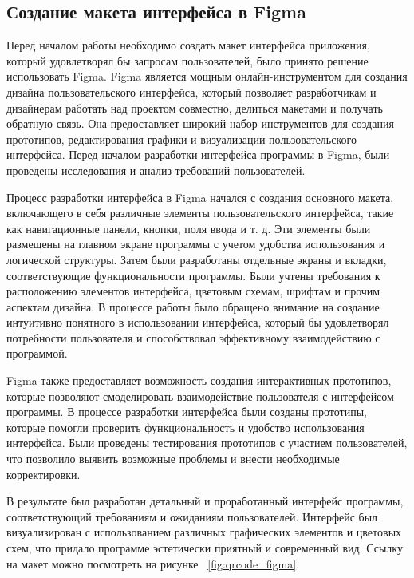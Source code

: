 \subsection{Создание макета интерфейса в Figma}

Перед началом работы необходимо создать макет интерфейса приложения, который удовлетворял бы запросам пользователей, было принято решение использовать Figma. Figma является мощным онлайн-инструментом для создания дизайна пользовательского интерфейса, который позволяет разработчикам и дизайнерам работать над проектом совместно, делиться макетами и получать обратную связь. Она предоставляет широкий набор инструментов для создания прототипов, редактирования графики и визуализации пользовательского интерфейса. Перед началом разработки интерфейса программы в Figma, были проведены исследования и анализ требований пользователей. 

Процесс разработки интерфейса в Figma начался с создания основного макета, включающего в себя различные элементы пользовательского интерфейса, такие как навигационные панели, кнопки, поля ввода и т. д. Эти элементы были размещены на главном экране программы с учетом удобства использования и логической структуры. Затем были разработаны отдельные экраны и вкладки, соответствующие функциональности программы. Были учтены требования к расположению элементов интерфейса, цветовым схемам, шрифтам и прочим аспектам дизайна. В процессе работы было обращено внимание на создание интуитивно понятного в использовании интерфейса, который бы удовлетворял потребности пользователя и способствовал эффективному взаимодействию с программой.

Figma также предоставляет возможность создания интерактивных прототипов, которые позволяют смоделировать взаимодействие пользователя с интерфейсом программы. В процессе разработки интерфейса были созданы прототипы, которые помогли проверить функциональность и удобство использования интерфейса. Были проведены тестирования прототипов с участием пользователей, что позволило выявить возможные проблемы и внести необходимые корректировки.

В результате  был разработан детальный и проработанный интерфейс программы, соответствующий требованиям и ожиданиям пользователей. Интерфейс был визуализирован с использованием различных графических элементов и цветовых схем, что придало программе эстетически приятный и современный вид. Ссылку на макет можно посмотреть на рисунке ~\ref{fig:qrcode_figma}.